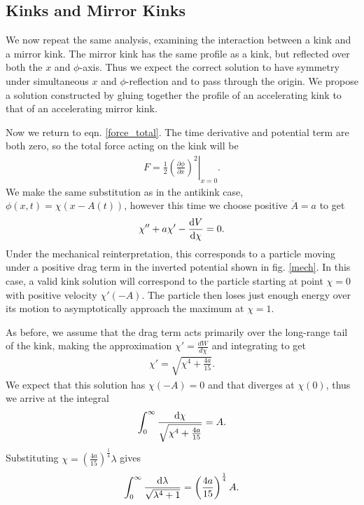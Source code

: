 \documentclass[11pt, oneside]{article}  	%
\numberwithin{equation}{section}
\newcommand{\drv}{\ensuremath{\textup{d}}}
\begin{document}
\subsection{Kinks and Mirror Kinks}\label{sec:kink-mirrorkink-manton}
We now repeat the same analysis, examining the interaction between a kink and a mirror kink. The mirror kink has the same profile as a kink, but reflected over both the $x$ and $\phi$-axis. Thus we expect the correct solution to have symmetry under simultaneous $x$ and $\phi$-reflection and to pass through the origin. We propose a solution constructed by gluing together the profile of an accelerating kink to that of an accelerating mirror kink.\par
Now we return to eqn. \ref{force_total}. The time derivative and potential term are both zero, so the total force acting on the kink will be
\begin{align}\label{force_mirror_kink}
    F =\left . \frac{1}{2}\left ( \frac{\partial\phi}{\partial x}\right )^2 \right |_{x=0}.
\end{align}
We make the same substitution as in the antikink case, $\phi(x,t) = \chi\left( x - A(t)\right)$, however this time we choose positive $\ddot{A} = a$ to get
\begin{equation}
    \chi'' + a\chi' - \frac{\drv V }{\drv \chi}=0.
\end{equation}
Under the mechanical reinterpretation, this corresponds to a particle moving under a positive drag term in the inverted potential shown in fig. \ref{mech}. In this case, a valid kink solution will correspond to the particle starting at point $\chi = 0$ with positive velocity $\chi'(-A)$. The particle then loses just enough energy over its motion to asymptotically approach the maximum at $\chi = 1$.\par
As before, we assume that the drag term acts primarily over the long-range tail of the kink, making the approximation $\chi ' = \frac{dW}{d\chi}$ and integrating to get
\begin{align}
    \chi' = \sqrt{\chi^4 + \frac{4a}{15}}.
\end{align}
We expect that this solution has $\chi(-A) = 0$ and that  diverges at $\chi(0)$, thus we arrive at the integral
\begin{align}
    \int^{\infty}_{0}\frac{\drv \chi}{\sqrt{\chi^4 + \frac{4a}{15}}} = A.
\end{align}
Substituting $\chi =\left( \frac{4a}{15}\right)^{\frac{1}{4}}\lambda$ gives
\begin{equation}
    \int_{0}^{\infty}\frac{\drv \lambda}{\sqrt{\lambda^4 + 1}} = \left( \frac{4a}{15}\right)^{\frac{1}{4}} A.
\end{equation}
\end{document}

